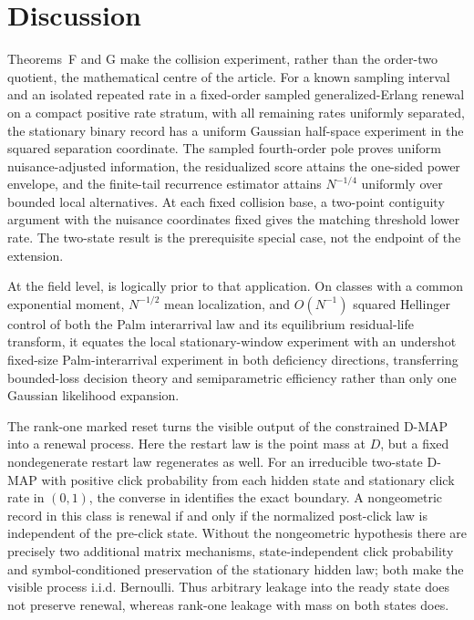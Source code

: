 \section{Discussion}\label{sec:discussion}

Theorems~F and G make the collision experiment, rather than the order-two
quotient, the mathematical centre of the article.  For a known sampling
interval and an isolated repeated rate in a fixed-order sampled
generalized-Erlang renewal on a compact positive rate stratum, with all
remaining rates uniformly separated, the stationary binary record has a
uniform Gaussian half-space experiment in the squared separation coordinate.
The sampled fourth-order pole proves uniform nuisance-adjusted information,
the residualized score attains the one-sided power envelope, and the finite-tail
recurrence estimator attains \(N^{-1/4}\) uniformly over bounded local
alternatives.  At each fixed collision base, a two-point contiguity argument
with the nuisance coordinates fixed gives the matching threshold lower rate.
The two-state result is the prerequisite special case, not the endpoint of the
extension.

At the field level,  is
logically prior to that application.  On classes with a common exponential
moment, \(N^{-1/2}\) mean localization, and \(O(N^{-1})\) squared Hellinger
control of both the Palm interarrival law and its equilibrium residual-life
transform, it equates the local stationary-window experiment with an
undershot fixed-size Palm-interarrival experiment in both deficiency
directions, transferring bounded-loss decision theory and semiparametric
efficiency rather than only one Gaussian likelihood expansion.

The rank-one marked reset turns the visible output of the constrained D-MAP
into a renewal process.  Here the restart law is the point mass at \(D\), but
a fixed nondegenerate restart law regenerates as well.  For an irreducible
two-state D-MAP with positive click probability from each hidden state and
stationary click rate in \((0,1)\), the converse in
 identifies the exact
boundary.  A nongeometric record in this class is renewal if and only if the
normalized post-click law is independent of the pre-click state.  Without the
nongeometric hypothesis there are precisely two additional matrix mechanisms,
state-independent click probability and symbol-conditioned preservation of the
stationary hidden law; both make the visible process i.i.d. Bernoulli.  Thus
arbitrary leakage into the ready state does not preserve renewal, whereas
rank-one leakage with mass on both states does.

